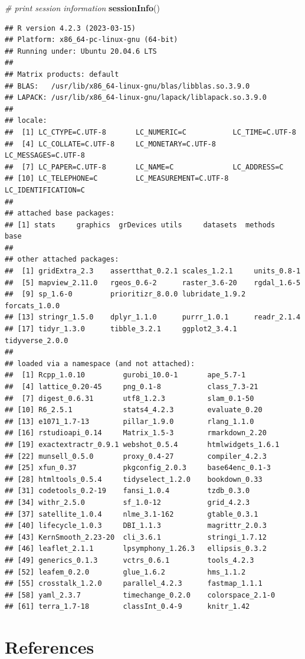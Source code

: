 \documentclass[12pt,]{book}
\newenvironment{Shaded}{\begin{snugshade}}{\end{snugshade}}
\newcommand{\CommentTok}[1]{\textcolor[rgb]{0.56,0.35,0.01}{\textit{#1}}}
\newcommand{\KeywordTok}[1]{\textcolor[rgb]{0.13,0.29,0.53}{\textbf{#1}}}
\newcommand{\NormalTok}[1]{#1}
\begin{document}
\begin{Shaded}
\begin{Highlighting}[]
\CommentTok{# print session information}
\KeywordTok{sessionInfo}\NormalTok{()}
\end{Highlighting}
\end{Shaded}

\begin{verbatim}
## R version 4.2.3 (2023-03-15)
## Platform: x86_64-pc-linux-gnu (64-bit)
## Running under: Ubuntu 20.04.6 LTS
## 
## Matrix products: default
## BLAS:   /usr/lib/x86_64-linux-gnu/blas/libblas.so.3.9.0
## LAPACK: /usr/lib/x86_64-linux-gnu/lapack/liblapack.so.3.9.0
## 
## locale:
##  [1] LC_CTYPE=C.UTF-8       LC_NUMERIC=C           LC_TIME=C.UTF-8       
##  [4] LC_COLLATE=C.UTF-8     LC_MONETARY=C.UTF-8    LC_MESSAGES=C.UTF-8   
##  [7] LC_PAPER=C.UTF-8       LC_NAME=C              LC_ADDRESS=C          
## [10] LC_TELEPHONE=C         LC_MEASUREMENT=C.UTF-8 LC_IDENTIFICATION=C   
## 
## attached base packages:
## [1] stats     graphics  grDevices utils     datasets  methods   base     
## 
## other attached packages:
##  [1] gridExtra_2.3    assertthat_0.2.1 scales_1.2.1     units_0.8-1     
##  [5] mapview_2.11.0   rgeos_0.6-2      raster_3.6-20    rgdal_1.6-5     
##  [9] sp_1.6-0         prioritizr_8.0.0 lubridate_1.9.2  forcats_1.0.0   
## [13] stringr_1.5.0    dplyr_1.1.0      purrr_1.0.1      readr_2.1.4     
## [17] tidyr_1.3.0      tibble_3.2.1     ggplot2_3.4.1    tidyverse_2.0.0 
## 
## loaded via a namespace (and not attached):
##  [1] Rcpp_1.0.10         gurobi_10.0-1       ape_5.7-1          
##  [4] lattice_0.20-45     png_0.1-8           class_7.3-21       
##  [7] digest_0.6.31       utf8_1.2.3          slam_0.1-50        
## [10] R6_2.5.1            stats4_4.2.3        evaluate_0.20      
## [13] e1071_1.7-13        pillar_1.9.0        rlang_1.1.0        
## [16] rstudioapi_0.14     Matrix_1.5-3        rmarkdown_2.20     
## [19] exactextractr_0.9.1 webshot_0.5.4       htmlwidgets_1.6.1  
## [22] munsell_0.5.0       proxy_0.4-27        compiler_4.2.3     
## [25] xfun_0.37           pkgconfig_2.0.3     base64enc_0.1-3    
## [28] htmltools_0.5.4     tidyselect_1.2.0    bookdown_0.33      
## [31] codetools_0.2-19    fansi_1.0.4         tzdb_0.3.0         
## [34] withr_2.5.0         sf_1.0-12           grid_4.2.3         
## [37] satellite_1.0.4     nlme_3.1-162        gtable_0.3.1       
## [40] lifecycle_1.0.3     DBI_1.1.3           magrittr_2.0.3     
## [43] KernSmooth_2.23-20  cli_3.6.1           stringi_1.7.12     
## [46] leaflet_2.1.1       lpsymphony_1.26.3   ellipsis_0.3.2     
## [49] generics_0.1.3      vctrs_0.6.1         tools_4.2.3        
## [52] leafem_0.2.0        glue_1.6.2          hms_1.1.2          
## [55] crosstalk_1.2.0     parallel_4.2.3      fastmap_1.1.1      
## [58] yaml_2.3.7          timechange_0.2.0    colorspace_2.1-0   
## [61] terra_1.7-18        classInt_0.4-9      knitr_1.42
\end{verbatim}

\hypertarget{references}{%
\chapter{References}\label{references}}


\end{document}
